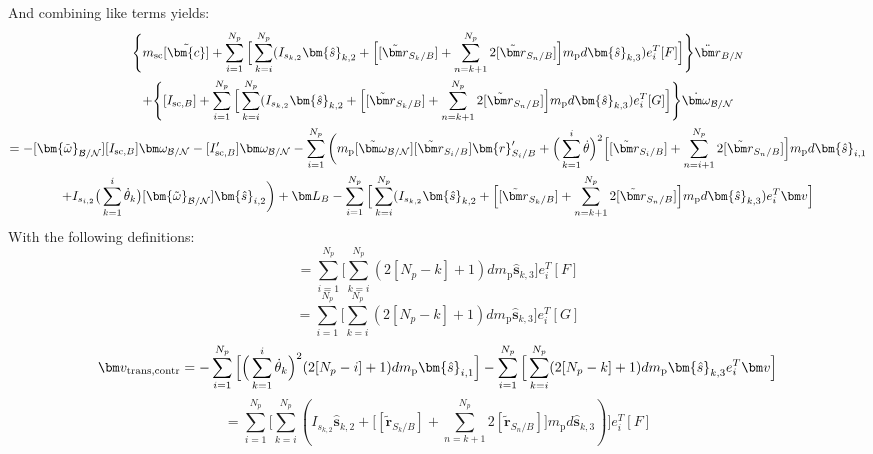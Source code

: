\documentclass[paper]{aiaaNew}
\begin{document}
And combining like terms yields:
	\begin{multline}
\Bigg \lbrace m_{\text{sc}} [\tilde{\bm{c}}] + \sum\limits_{i=1}^{N_p} \Big[\sum^{N_p}_{k=i} (I_{s_{k,2}} \bm{\hat{s}}_{k,2} + \Big[ [\tilde{{\bm r}}_{S_{k}/B}] + \sum\limits_{n=k+1}^{N_p}2[\tilde{{\bm r}}_{S_{n}/B}]\Big]m_{\text{p}} d \bm{\hat{s}}_{k,3} ) e_{i}^T[F] \Big] \Bigg \rbrace \ddot{\bm r}_{B/N} \\
+ \Bigg \lbrace [I_{\text{sc},B}] + \sum\limits_{i=1}^{N_p} \Big[\sum^{N_p}_{k=i} (I_{s_{k,2}} \bm{\hat{s}}_{k,2} + \Big[ [\tilde{{\bm r}}_{S_{k}/B}] + \sum\limits_{n=k+1}^{N_p}2[\tilde{{\bm r}}_{S_{n}/B}]\Big]m_{\text{p}} d \bm{\hat{s}}_{k,3} ) e_{i}^T[G] \Big] \Bigg \rbrace \dot{\bm\omega}_{\cal B/N} \\
= -[\bm{\tilde{\omega}}_{\cal B/N}] [I_{\text{sc},B}] \bm\omega_{\cal B/N} - [I'_{\text{sc},B}] \bm\omega_{\cal B/N} - \sum\limits_{i=1}^{N_p}\bigg( m_{\text{p}} [\tilde{\bm\omega}_{\cal B/N}] [\tilde{{\bm r}}_{S_{i}/B}] \bm{r}'_{S_i/B} + \Big( \sum\limits_{k=1}^{i} \dot{\theta}\Big)^2 \Big[[\tilde{{\bm r}}_{S_{i}/B}] + \sum\limits_{n=i+1}^{N_p}2[\tilde{{\bm r}}_{S_{n}/B}]\Big] m_{\text{p}} d \bm{\hat{s}}_{i,1}\\
+ I_{s_{i,2}} \big(\sum^{i}_{k=1}\dot{\theta}_k\big) [\bm{\tilde{\omega}}_{\cal B/N}] \bm{\hat{s}}_{i,2} \bigg) + \bm L_B - \sum\limits_{i=1}^{N_p} \Big[\sum^{N_p}_{k=i} (I_{s_{k,2}} \bm{\hat{s}}_{k,2} + \Big[ [\tilde{{\bm r}}_{S_{k}/B}] + \sum\limits_{n=k+1}^{N_p}2[\tilde{{\bm r}}_{S_{n}/B}]\Big]m_{\text{p}} d \bm{\hat{s}}_{k,3} ) e_{i}^T \bm v \Big]
\label{eq:Final8}
\end{multline}
With the following definitions:
\begin{equation}
[A_{\text{contr}}] = \sum^{N_p}_{i=1} \Big[\sum^{N_p}_{k=i} (2[N_p-k]+1) d m_{\text{p}} \bm{\hat{s}}_{k,3}\Big] e_{i}^T[F]  
\end{equation}
\begin{equation}
[B_{\text{contr}}] =  \sum^{N_p}_{i=1} \Big[\sum^{N_p}_{k=i} (2[N_p-k]+1) d m_{\text{p}} \bm{\hat{s}}_{k,3}\Big] e_{i}^T[G]
\end{equation}
\begin{equation}
\bm v_{\text{trans,contr}} = -\sum^{N_p}_{i=1} \Big[ \Big(\sum^{i}_{k=1}\dot{\theta}_k\Big)^2 (2[N_p-i]+1) d m_{\text{p}} \bm{\hat{s}}_{i,1} \Big]\\
- \sum^{N_p}_{i=1} \Big[\sum^{N_p}_{k=i} (2[N_p-k]+1) d m_{\text{p}} \bm{\hat{s}}_{k,3} e_{i}^T \bm v \Big] 
\end{equation}
\begin{equation}
[C_{\text{contr}}] = \sum\limits_{i=1}^{N_p} \Big[\sum^{N_p}_{k=i} (I_{s_{k,2}} \bm{\hat{s}}_{k,2} + \Big[ [\tilde{{\bm r}}_{S_{k}/B}] + \sum\limits_{n=k+1}^{N_p}2[\tilde{{\bm r}}_{S_{n}/B}]\Big]m_{\text{p}} d \bm{\hat{s}}_{k,3} ) \Big]e_{i}^T[F]  
\end{equation}
\end{document}
